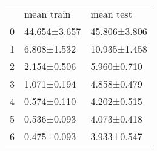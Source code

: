 \begin{tabular}{lll}
 & mean train & mean test \\
0 & 44.654±3.657 & 45.806±3.806 \\
1 & 6.808±1.532 & 10.935±1.458 \\
2 & 2.154±0.506 & 5.960±0.710 \\
3 & 1.071±0.194 & 4.858±0.479 \\
4 & 0.574±0.110 & 4.202±0.515 \\
5 & 0.536±0.093 & 4.073±0.418 \\
6 & 0.475±0.093 & 3.933±0.547 \\
\end{tabular}
